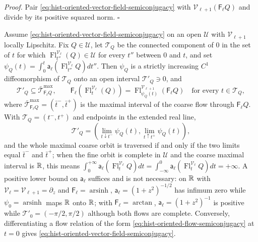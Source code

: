 \noindent\emph{Proof.}
Pair \eqref{eq:hist-oriented-vector-field-semiconjugacy} with
$\mathscr V_{\ell+1}(\mathsf F_\ell Q)$ and divide by its positive squared norm.
$\square$

\label{prop:hist-oriented-semiconjugacy}%
Assume \eqref{eq:hist-oriented-vector-field-semiconjugacy} on an open $\mathcal U$ with
$\mathscr V_{\ell+1}$ locally Lipschitz.  Fix $Q\in\mathcal U$, let $\mathcal T_Q$ be the
connected component of $0$ in the set of $t$ for which
$\operatorname{Fl}^{\mathscr V_\ell}_{t''}(Q)\in\mathcal U$ for every $t''$ between $0$
and $t$, and set $\psi_Q(t)=\int_0^t\mathsf a_\ell(\operatorname{Fl}^{\mathscr
V_\ell}_{t''}Q) dt''$.  Then $\psi_Q$ is a strictly increasing $C^1$ diffeomorphism of
$\mathcal T_Q$ onto an open interval $\mathcal T'_Q\ni0$, and
\begin{equation}
\mathcal T'_Q\subseteq\bar{\mathcal T}^{\max}_{\mathsf F_\ell Q},
\qquad
\mathsf F_\ell\left(\operatorname{Fl}^{\mathscr V_\ell}_t(Q)\right)
=\operatorname{Fl}^{\mathscr V_{\ell+1}}_{\psi_Q(t)}\left(\mathsf F_\ell Q\right)
\quad\text{for every }t\in\mathcal T_Q,
\label{eq:hist-oriented-flow-semiconjugacy}
\end{equation}
where $\bar{\mathcal T}^{\max}_{\mathsf F_\ell Q}=(\bar t^-,\bar t^+)$ is the maximal
interval of the coarse flow through $\mathsf F_\ell Q$.  With $\mathcal T_Q=(t^-,t^+)$
and endpoints in the extended real line,
\begin{equation}
\mathcal T'_Q
=\left(
\lim_{t\downarrow t^-}\psi_Q(t),
\lim_{t\uparrow t^+}\psi_Q(t)
\right),
\label{eq:hist-semiconjugacy-endpoint-image}
\end{equation}
and the whole maximal coarse orbit is traversed if and only if the two limits equal
$\bar t^-$ and $\bar t^+$; when the fine orbit is complete in $\mathcal U$ and the coarse
maximal interval is $\mathbb R$, this means
$\int_0^{+\infty}\mathsf a_\ell(\operatorname{Fl}^{\mathscr V_\ell}_{t}Q)dt
=\int_{-\infty}^{0}\mathsf a_\ell(\operatorname{Fl}^{\mathscr V_\ell}_{t}Q)dt=+\infty$.
A positive lower bound on $\mathsf a_\ell$ suffices and is not necessary: on $\mathbb R$ with
$\mathscr V_\ell=\mathscr V_{\ell+1}=\partial_z$ and
$\mathsf F_\ell=\operatorname{arsinh}$, $\mathsf a_\ell=(1+z^2)^{-1/2}$ has infimum zero
while $\psi_0=\operatorname{arsinh}$ maps $\mathbb R$ onto $\mathbb R$; with $\mathsf F_\ell=\arctan$,
$\mathsf a_\ell=(1+z^2)^{-1}$ is positive while $\mathcal T'_0=(-\pi/2,\pi/2)$ although
both flows are complete.  Conversely, differentiating a flow relation of the form
\eqref{eq:hist-oriented-flow-semiconjugacy} at $t=0$ gives
\eqref{eq:hist-oriented-vector-field-semiconjugacy}.  

